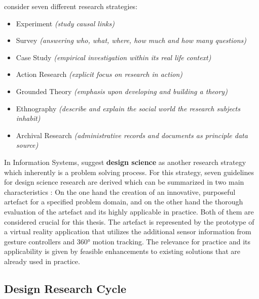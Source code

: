 \cite{Saunders2009} consider seven different research strategies:
\begin{itemize}[noitemsep,nolistsep]
	\item Experiment \textit{(study causal links)}
	\item Survey \textit{(answering who, what, where, how much and how many questions)}
	\item Case Study \textit{(empirical investigation within its real life context)}
	\item Action Research \textit{(explicit focus on research in action)}
	\item Grounded Theory \textit{(emphasis upon developing and building a theory)}
	\item Ethnography \textit{(describe and explain the social world the research subjects inhabit)}
	\item Archival Research \textit{(administrative records and documents as principle data source)}
\end{itemize}
In Information Systems, \cite{Hevner2010} suggest \textbf{design science} as another research strategy which inherently is a problem solving process. For this strategy, seven guidelines for design science research are derived which can be summarized in two main characteristics \citep{Hevner2010}: On the one hand the creation of an innovative, purposeful artefact for a specified problem domain, and on the other hand the thorough evaluation of the artefact and its highly applicable in practice. Both of them are considered crucial for this thesis. \newline
The artefact is represented by the prototype of a virtual reality application that utilizes the additional sensor information from gesture controllers and 360° motion tracking. The relevance for practice and its applicability is given by feasible enhancements to existing solutions that are already used in practice.




\subsection{Design Research Cycle}

